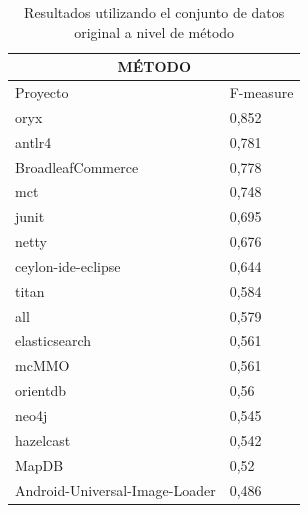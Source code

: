 \begin{table}[H]
\captionsetup{labelsep=period, labelfont=bf}
\caption{\label{table:original_result_weka_method_result} Resultados utilizando el conjunto de datos original a nivel de método}
\centering
{
\fontsize{12pt}{12pt}\selectfont
\begin{tabular}{ll}
\toprule
\multicolumn{2}{c}{MÉTODO} \\
\toprule
Proyecto                        & F-measure \\
\midrule
oryx                           & 0,852     \\
antlr4                         & 0,781     \\
BroadleafCommerce              & 0,778     \\
mct                            & 0,748     \\
junit                          & 0,695     \\
netty                          & 0,676     \\
ceylon-ide-eclipse             & 0,644     \\
titan                          & 0,584     \\
all                            & 0,579     \\
elasticsearch                  & 0,561     \\
mcMMO                          & 0,561     \\
orientdb                       & 0,56      \\
neo4j                          & 0,545     \\
hazelcast                      & 0,542     \\
MapDB                          & 0,52      \\
Android-Universal-Image-Loader & 0,486     \\
\bottomrule
\end{tabular}
}

\end{table}

